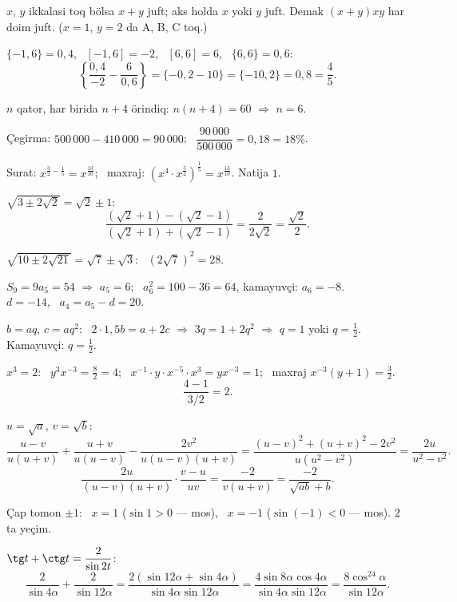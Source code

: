 




$x$, $y$ ikkalasi toq bölsa $x+y$ juft; aks holda $x$ yoki $y$ juft. Demak $(x+y)xy$ har doim juft. ($x=1$, $y=2$ da A, B, C toq.)

$\{-1{,}6\}=0{,}4$, \ $[-1{,}6]=-2$, \ $[6{,}6]=6$, \ $\{6{,}6\}=0{,}6$:
\[\left\{\frac{0{,}4}{-2}-\frac6{0{,}6}\right\}=\{-0{,}2-10\}=\{-10{,}2\}=0{,}8=\frac45.\]

$n$ qator, har birida $n+4$ örindiq: $n(n+4)=60$ $\Rightarrow$ $n=6$.

Çegirma: $500\,000-410\,000=90\,000$; \ $\dfrac{90\,000}{500\,000}=0{,}18=18\%$.

Surat: $x^{\frac32-\frac15}=x^{\frac{13}{10}}$; \ maxraj: $\left(x^4\cdot x^{\frac52}\right)^{\frac15}=x^{\frac{13}{10}}$. Natija $1$.

$\sqrt{3\pm2\sqrt2}=\sqrt2\pm1$:
\[\frac{(\sqrt2+1)-(\sqrt2-1)}{(\sqrt2+1)+(\sqrt2-1)}=\frac2{2\sqrt2}=\frac{\sqrt2}2.\]

$\sqrt{10\pm2\sqrt{21}}=\sqrt7\pm\sqrt3$: \ $\left(2\sqrt7\right)^2=28$.

$S_9=9a_5=54$ $\Rightarrow$ $a_5=6$; \ $a_6^2=100-36=64$, kamayuvçi: $a_6=-8$.\\
$d=-14$, \ $a_4=a_5-d=20$.

$b=aq$, $c=aq^2$: \ $2\cdot1{,}5b=a+2c$ $\Rightarrow$ $3q=1+2q^2$ $\Rightarrow$ $q=1$ yoki $q=\frac12$. Kamayuvçi: $q=\frac12$.

$x^3=2$: \ $y^3x^{-3}=\frac82=4$; \ $x^{-1}\cdot y\cdot x^{-5}\cdot x^3=yx^{-3}=1$; \ maxraj $x^{-3}(y+1)=\frac32$.
\[\frac{4-1}{3/2}=2.\]

$u=\sqrt a$, $v=\sqrt b$:
\[\frac{u-v}{u(u+v)}+\frac{u+v}{u(u-v)}-\frac{2v^2}{u(u-v)(u+v)}=\frac{(u-v)^2+(u+v)^2-2v^2}{u\left(u^2-v^2\right)}=\frac{2u}{u^2-v^2}.\]
\[\frac{2u}{(u-v)(u+v)}\cdot\frac{v-u}{uv}=\frac{-2}{v(u+v)}=\frac{-2}{\sqrt{ab}+b}.\]

Çap tomon $\pm1$: \ $x=1$ ($\sin1>0$ — mos), \ $x=-1$ ($\sin(-1)<0$ — mos). $2$ ta yeçim.

$\tg t+\ctg t=\dfrac2{\sin2t}$:
\[\frac2{\sin4\alpha}+\frac2{\sin12\alpha}=\frac{2(\sin12\alpha+\sin4\alpha)}{\sin4\alpha\sin12\alpha}=\frac{4\sin8\alpha\cos4\alpha}{\sin4\alpha\sin12\alpha}=\frac{8\cos^24\alpha}{\sin12\alpha}.\]

